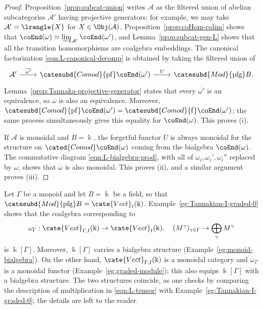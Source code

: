 \begin{proof}
	Proposition~\ref{prop:subcat-union} writes $\mathcal{A}$ as the filtered
	union of abelian subcategories $\mathcal{A}'$ having projective
	generators; for example, we may take $\mathcal{A}'=\lrangle{X}$ for
	$X\in\Obj(\mathcal{A})$. Proposition~\ref{prop:coHom-colim} shows that
	$\coEnd(\omega)\simeq\varinjlim_{\mathcal{A}'}\coEnd(\omega')$, and
	Lemma~\ref{prop:subcat-gen-L} shows that all the transition homomorphisms
	are coalgebra embeddings. The canonical factorization
	\eqref{eqn:L-canonical-decomp} is obtained by taking the filtered union
	of
	\[\begin{tikzcd}
		\mathcal{A}' \arrow[r, "{\overline{\omega'}}"] & \catesubd{Comod}{\mathrm{pf}}\coEnd(\omega') \arrow[r, "U"] & \catesubd{Mod}{\mathrm{pfg}}B.
	\end{tikzcd}\]
	Lemma~\ref{prop:Tannaka-projective-generator} states that every
	$\overline{\omega'}$ is an equivalence, so $\overline\omega$ is also an
	equivalence. Moreover,
	$\catesubd{Comod}{\mathrm{pf}}\coEnd(\omega')=
	\catesubd{Comod}{\mathrm f}\coEnd(\omega')$; the same process
	simultaneously gives this equality for $\coEnd(\omega)$. This proves (i).

	If $\mathcal{A}$ is monoidal and $B=\Bbbk$, the forgetful functor $U$ is
	always monoidal for the structure on $\cated{Comod}\coEnd(\omega)$ coming
	from the bialgebra $\coEnd(\omega)$. The commutative diagram
	\eqref{eqn:L-bialgebra-prod}, with all of
	$\omega_i,\omega_i',\omega_i''$ replaced by $\omega$, shows that
	$\overline\omega$ is also monoidal. This proves (ii), and a similar
	argument proves (iii).
\end{proof}

\begin{example}\label{eg:Tannakian-I-graded}
	Let $\Gamma$ be a monoid and let $B=\Bbbk$ be a field, so that
	$\catesubd{Mod}{\mathrm{pfg}}B=\cate{Vect}_{\mathrm f}(\Bbbk)$.
	Example~\ref{eg:Tannakian-I-graded-0} shows that the coalgebra
	corresponding to
	\[ \omega_\Gamma: \cate{Vect}_{\Gamma, \mathrm{f}}(\Bbbk) \to \cate{Vect}_{\mathrm{f}}(\Bbbk), \quad (M^\gamma)_{\gamma \in \Gamma} \to \bigoplus_\gamma M^\gamma \]
	is $\Bbbk[\Gamma]$. Moreover, $\Bbbk[\Gamma]$ carries a bialgebra
	structure (Example~\ref{eg:monoid-bialgebra}). On the other hand,
	$\cate{Vect}_{\Gamma,\mathrm f}(\Bbbk)$ is a monoidal category and
	$\omega_\Gamma$ is a monoidal functor (Example~\ref{eg:graded-module});
	this also equips $\Bbbk[\Gamma]$ with a bialgebra structure. The two
	structures coincide, as one checks by comparing the description of
	multiplication in \eqref{eqn:L-tensor} with
	Example~\ref{eg:Tannakian-I-graded-0}; the details are left to the reader.
\end{example}
